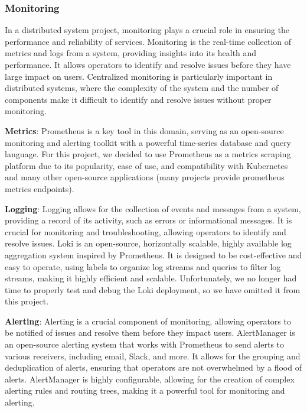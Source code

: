 \documentclass{report}
\begin{document}
    \subsubsection{Monitoring}
    In a distributed system project, monitoring plays a crucial role in ensuring the performance and reliability of services. Monitoring is the real-time collection of metrics and logs from a system, providing insights into its health and performance. It allows operators to identify and resolve issues before they have large impact on users. Centralized monitoring is particularly important in distributed systems, where the complexity of the system and the number of components make it difficult to identify and resolve issues without proper monitoring.

    \textbf{Metrics}:
    Prometheus is a key tool in this domain, serving as an open-source monitoring and alerting toolkit with a powerful time-series database and query language. For this project, we decided to use Prometheus as a metrics scraping platform due to its popularity, ease of use, and compatibility with Kubernetes and many other open-source applications (many projects provide prometheus metrics endpoints).

    \textbf{Logging}:
    Logging allows for the collection of events and messages from a system, providing a record of its activity, such as errors or informational messages. It is crucial for monitoring and troubleshooting, allowing operators to identify and resolve issues. Loki is an open-source, horizontally scalable, highly available log aggregation system inspired by Prometheus. It is designed to be cost-effective and easy to operate, using labels to organize log streams and queries to filter log streams, making it highly efficient and scalable. Unfortunately, we no longer had time to properly test and debug the Loki deployment, so we have omitted it from this project.

    \textbf{Alerting}:
    Alerting is a crucial component of monitoring, allowing operators to be notified of issues and resolve them before they impact users. AlertManager is an open-source alerting system that works with Prometheus to send alerts to various receivers, including email, Slack, and more. It allows for the grouping and deduplication of alerts, ensuring that operators are not overwhelmed by a flood of alerts. AlertManager is highly configurable, allowing for the creation of complex alerting rules and routing trees, making it a powerful tool for monitoring and alerting.
\end{document}
